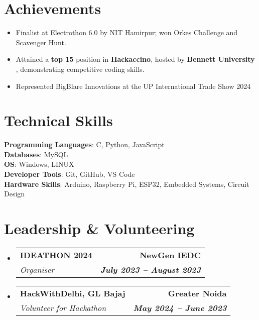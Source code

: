 \documentclass[letterpaper,11pt]{article}
\makeatletter
\newcommand{\resumeItem}[1]{
  \item\small{
    {#1 \vspace{-2pt}}
  }
}
\newcommand{\resumeSubheading}[4]{
  \vspace{-2pt}\item
    \begin{tabular*}{1.0\textwidth}[t]{l@{\extracolsep{\fill}}r}
      \textbf{#1} & \textbf{\small #2} \\
      \textit{\small#3} & \textit{\small #4} \\
    \end{tabular*}\vspace{-7pt}
}
\newcommand{\resumeSubHeadingListStart}{\begin{itemize}[leftmargin=0.0in, label={}]}
\newcommand{\resumeSubHeadingListEnd}{\end{itemize}}
\newcommand{\resumeItemListStart}{\begin{itemize}}
\newcommand{\resumeItemListEnd}{\end{itemize}\vspace{-5pt}}
\makeatother
\begin{document}
\vspace{-4.6pt}
\section{Achievements}

      \resumeItemListStart
      
        \resumeItem{Finalist at Electrothon 6.0 by NIT Hamirpur; won Orkes Challenge and Scavenger Hunt.}       
        \resumeItem{Attained a \textbf{top 15} position in \textbf{Hackaccino}, hosted by \textbf{Bennett University} , demonstrating competitive coding skills.} 
        \resumeItem{Represented BigBlare Innovations at the UP International Trade Show 2024}
      \resumeItemListEnd
            

\vspace{-10.5pt}
\section{Technical Skills}
  
        {\textbf{Programming Languages}: C, Python, JavaScript}\\
        {\textbf{Databases}: MySQL}\\
        {\textbf{OS}: Windows, LINUX}\\
        {\textbf{Developer Tools}: Git, GitHub, VS Code}\\
        {\textbf{Hardware Skills}: Arduino, Raspberry Pi, ESP32, Embedded Systems, Circuit Design}\\

\vspace{-5pt}
\section{Leadership \& Volunteering}
    \resumeSubHeadingListStart
    \resumeSubheading{IDEATHON 2024}{NewGen IEDC}{Organiser}{\textbf{July 2023 -- August 2023}}

        \resumeSubheading{HackWithDelhi, GL Bajaj}{Greater Noida}{Volunteer for Hackathon}{\textbf{May 2024 -- June 2023}}
            
    \resumeSubHeadingListEnd
\end{document}
